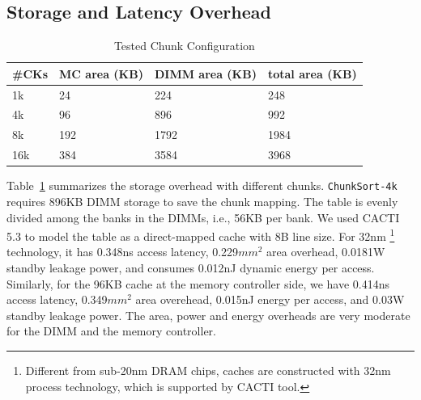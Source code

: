 
\subsection{Storage and Latency Overhead}


\begin{table}[htbp]
\centering
\caption{Tested Chunk Configuration}
\vspace{-0.25in}
\scalebox{0.85}
{
\begin{tabular}{llll}
\hline
\#CKs & MC area (KB) & DIMM area (KB) & total area (KB) \\
\hline\hline
1k	&24		&224		&248\\
4k	&96		&896		&992\\
8k	&192		&1792	&1984\\
16k	&384		&3584	&3968\\
\hline
\end{tabular}
}
\label{tab:tsc}
\end{table}

Table~\ref{tab:tsc} summarizes the storage overhead with different chunks. 
{\tt ChunkSort-4k} requires 896KB DIMM storage to save the chunk mapping. The table is evenly divided among the banks in the DIMMs, i.e., 56KB per bank. We used CACTI 5.3 to model the table as a direct-mapped cache with 8B line size. For 32nm 
{\footnote{Different from sub-20nm DRAM chips, caches are constructed with 32nm process technology, which is supported by CACTI tool.}}
technology, it has 0.348ns access latency, 0.229$mm^2$ area overhead, 0.0181W standby leakage power, and consumes 0.012nJ dynamic energy per access.  Similarly, for the 96KB cache at the memory controller side, we have 0.414ns access latency, 0.349$mm^2$ area overehead, 0.015nJ energy per access, and 0.03W standby leakage power. The area, power and energy overheads are very moderate for the DIMM and the memory controller.

